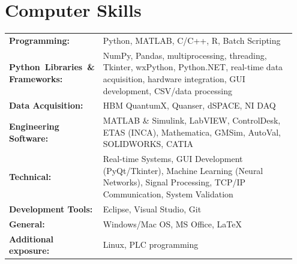 \documentclass[10pt, letterpaper]{article}
\newcommand{\showtext}{1}  %
\begin{document}
    \section{Computer Skills}
                \begin{tabular}{p{0.2\linewidth}  p{0.75\linewidth} }
                \textbf{Programming:} &Python, MATLAB, C/C++,  R, Batch Scripting\\ 
                \textbf{Python~Libraries~\& Frameworks:} & NumPy, Pandas, multiprocessing, threading, Tkinter, wxPython, Python.NET, real-time data acquisition, hardware integration, GUI development, CSV/data processing\\
                \textbf{Data Acquisition:}&
                HBM QuantumX, Quanser, dSPACE, NI DAQ \\
                \textbf{Engineering Software:} &  MATLAB \& Simulink, LabVIEW, ControlDesk, ETAS (INCA), Mathematica, GMSim, AutoVal, SOLIDWORKS, CATIA\\ 
                \textbf{Technical:} & Real-time Systems, GUI Development (PyQt/Tkinter), Machine Learning (Neural Networks), Signal Processing, TCP/IP Communication, System Validation\\
                \textbf{Development Tools:} &
                Eclipse, Visual Studio, Git\\
                \textbf{General:} &  Windows/Mac OS, MS Office, LaTeX \\ 
                \textbf{Additional exposure:} & Linux, PLC programming\\
                \end{tabular}






\end{document}
